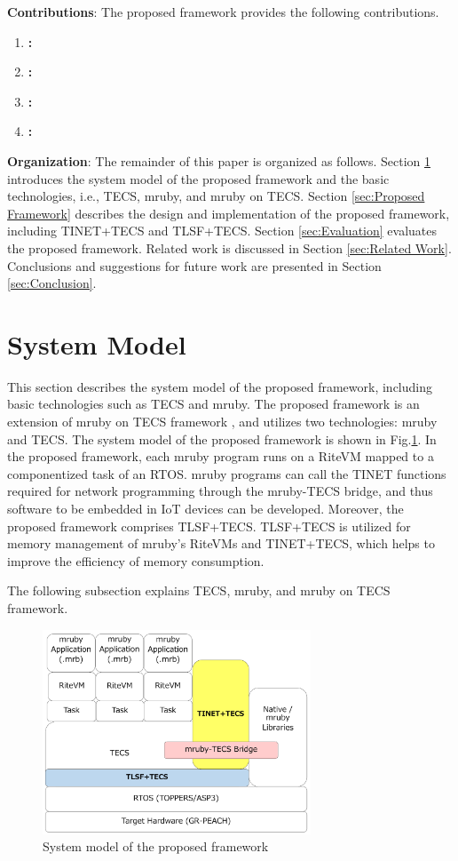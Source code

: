 \documentclass[JIP]{ipsj_v2/UTF8/ipsj}
\begin{document}
{\bf Contributions}: The proposed framework provides the following contributions.
\begin{enumerate}
\item {\bf :}
\item {\bf :}
\item {\bf :}
\item {\bf :}
\end{enumerate}

{\bf Organization}: The remainder of this paper is organized as follows.
Section \ref{sec:System Model} introduces the system model of the proposed framework and the basic technologies, i.e., TECS, mruby, and mruby on TECS.
Section \ref{sec:Proposed Framework} describes the design and implementation of the proposed framework, including TINET+TECS and TLSF+TECS.
Section \ref{sec:Evaluation} evaluates the proposed framework.
Related work is discussed in Section \ref{sec:Related Work}.
Conclusions and suggestions for future work are presented in Section \ref{sec:Conclusion}.


\section{System Model}
\label{sec:System Model}

This section describes the system model of the proposed framework, including basic technologies such as TECS and mruby.
The proposed framework is an extension of mruby on TECS framework \cite{par:mrubyonTECS}\cite{par:mrubyonTECS2}, and utilizes two technologies: mruby and TECS.
The system model of the proposed framework is shown in Fig.\ref{fig:SystemModel}.
In the proposed framework, each mruby program runs on a RiteVM mapped to a componentized task of an RTOS.
mruby programs can call the TINET functions required for network programming through the mruby-TECS bridge, and thus software to be embedded in IoT devices can be developed.
Moreover, the proposed framework comprises TLSF+TECS.
TLSF+TECS is utilized for memory management of mruby's RiteVMs and TINET+TECS, which helps to improve the efficiency of memory consumption.

The following subsection explains TECS, mruby, and mruby on TECS framework.


\begin{figure}[t]
    \centering
    \includegraphics[width=8.0cm,clip]{figure/SystemModel.pdf}
    \caption{System model of the proposed framework}
    \label{fig:SystemModel}
\end{figure}
\end{document}

